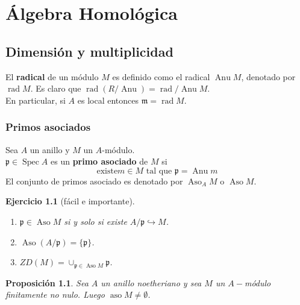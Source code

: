 \documentclass[12pt]{book}
\newtheorem{pro}{Proposición}
\newtheorem{ex}{Ejercicio}
\newcommand{\aso}{\operatorname{Aso}}
\newcommand{\pp}{\mathfrak{p}}
\begin{document}
\part{Álgebra Homológica}





\chapter{Dimensión y multiplicidad}


El \textbf{radical} de un módulo $M$ es definido como el radical $\operatorname{Anu} M $, denotado por $\operatorname{rad} M$. Es claro que $\operatorname{rad} (R/\operatorname{Anu})  = \operatorname{rad} / \operatorname{Anu} M$.\\
En particular, si $A$ es local entonces $\mathfrak{m} = \operatorname{rad}M$.


\section{Primos asociados}

Sea $A$ un anillo y $M$ un $A$-módulo. \\

$\mathfrak{p}\in \operatorname{Spec}A$ es un \textbf{primo asociado} de $M$ si $$\mbox{existe} m\in M \mbox{ tal que }   \mathfrak{p} = \operatorname{Anu} m $$
El conjunto de primos asociado es denotado por $\operatorname{Aso}_A M$ o $\operatorname{Aso}M$.

\begin{ex}[fácil e importante]
\begin{enumerate}
\item $\mathfrak{p}\in \operatorname{Aso} M$ si y solo si existe $ A / \mathfrak{p} \hookrightarrow M $.
\item $\operatorname{Aso} (A/ \mathfrak{p}) = \{\mathfrak{p}\}$.
\item $ZD (M)= \cup _{\pp\in \aso M} \pp$.
\end{enumerate}
\end{ex}




\begin{pro}
	Sea $A$ un anillo noetheriano y sea $M$ un $A-$módulo finitamente no nulo. Luego $\operatorname{aso} M \neq \emptyset$.\\ 
\end{pro}
\end{document}
